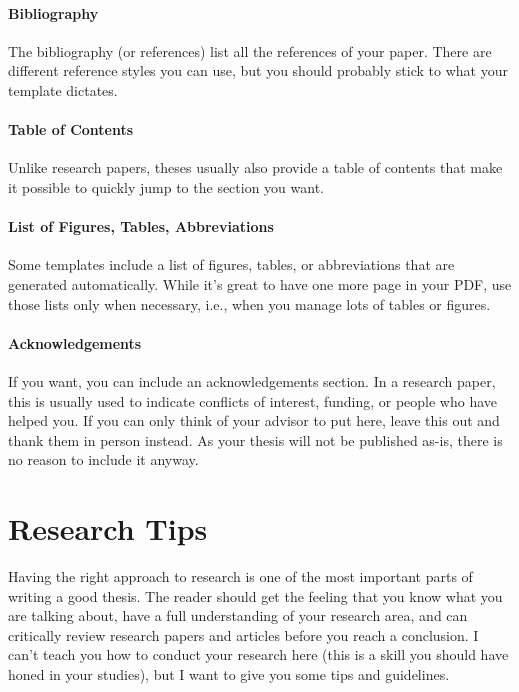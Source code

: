 \documentclass[a4]{article}
\begin{document}
\paragraph{Bibliography}

The bibliography (or references) list all the references of your paper.
There are different reference styles you can use, but you should probably stick to what your template dictates.

\paragraph{Table of Contents}

Unlike research papers, theses usually also provide a table of contents that make it possible to quickly jump to the section you want.

\paragraph{List of Figures, Tables, Abbreviations}

Some templates include a list of figures, tables, or abbreviations that are generated automatically.
While it's great to have one more page in your PDF, use those lists only when necessary, i.e., when you manage lots of tables or figures.

\paragraph{Acknowledgements}

If you want, you can include an acknowledgements section.
In a research paper, this is usually used to indicate conflicts of interest, funding, or people who have helped you.
If you can only think of your advisor to put here, leave this out and thank them in person instead.
As your thesis will not be published as-is, there is no reason to include it anyway.

\section{Research Tips}
\label{sec:research}

Having the right approach to research is one of the most important parts of writing a good thesis.
The reader should get the feeling that you know what you are talking about, have a full understanding of your research area, and can critically review research papers and articles before you reach a conclusion.
I can't teach you how to conduct your research here (this is a skill you should have honed in your studies), but I want to give you some tips and guidelines.
\end{document}
